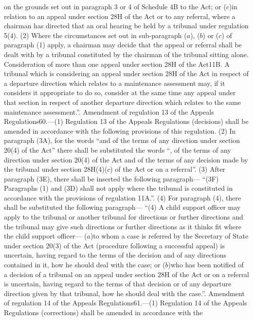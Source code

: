 \documentclass[a4paper]{article}
\begin{document}
on the grounds set out in paragraph 3 or 4 of Schedule 4B to the Act; or
($c$)in relation to an appeal under section 28H of the Act or to any referral,
where a chairman has directed that an oral hearing be held by a tribunal under
regulation 5(4).
(2) Where the circumstances set out in sub-paragraph ($a$), ($b$) or ($c$) of
paragraph (1) apply, a chairman may decide that the appeal or referral shall be
dealt with by a tribunal constituted by the chairman of the tribunal sitting
alone.
Consideration of more than one appeal under section 28H of the Act11B. A
tribunal which is considering an appeal under section 28H of the Act in respect
of a departure direction which relates to a maintenance assessment may, if it
considers it appropriate to do so, consider at the same time any appeal under
that section in respect of another departure direction which relates to the same
maintenance assessment.”.
Amendment of regulation 13 of the Appeals Regulations60.—(1) Regulation 13 of
the Appeals Regulations (decisions) shall be amended in accordance with the
following provisions of this regulation.
(2) In paragraph (3A), for the words “and of the terms of any direction under
section 20(4) of the Act” there shall be substituted the words “, of the terms
of any direction under section 20(4) of the Act and of the terms of any decision
made by the tribunal under section 28H(4)($c$) of the Act or on a referral”.
(3) After paragraph (3E), there shall be inserted the following paragraph—
“(3F) Paragraphs (1) and (3D) shall not apply where the tribunal is constituted
in accordance with the provisions of regulation 11A.”.
(4) For paragraph (4), there shall be substituted the following paragraph—
“(4) A child support officer may apply to the tribunal or another tribunal for
directions or further directions and the tribunal may give such directions or
further directions as it thinks fit where the child support officer—
($a$)to whom a case is referred by the Secretary of State under section 20(3) of
the Act (procedure following a successful appeal) is uncertain, having regard to
the terms of the decision and of any directions contained in it, how he should
deal with the case; or
($b$)who has been notified of a decision of a tribunal on an appeal under section
28H of the Act or on a referral is uncertain, having regard to the terms of that
decision or of any departure direction given by that tribunal, how he should
deal with the case.”.
Amendment of regulation 14 of the Appeals Regulations61.—(1) Regulation 14 of
the Appeals Regulations (corrections) shall be amended in accordance with the
\end{document}
